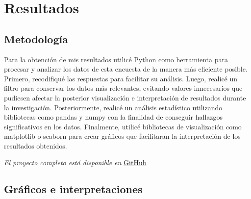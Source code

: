 \documentclass{article}
\begin{document}
	\section*{Resultados}
	
	\subsection*{Metodología}
	
	 Para la obtención de mis resultados utilicé Python como herramienta para procesar y analizar los datos de esta encuesta de la manera más eficiente posible. Primero, recodifiqué las respuestas para facilitar su análisis. Luego, realicé un filtro para conservar los datos más relevantes, evitando valores innecesarios que pudiesen afectar la posterior visualización e interpretación de resultados durante la investigación. Posteriormente, realicé un análisis estadístico utilizando bibliotecas como pandas y numpy con la finalidad de conseguir hallazgos significativos en los datos. Finalmente, utilicé bibliotecas de visualización como matplotlib o seaborn para crear gráficos que facilitaran la interpretación de los resultados obtenidos.
	 
	\begin{center}
		{\footnotesize \textit{El proyecto completo está disponible en} \href{https://github.com/ElK1000o/Taller-Ciencia-de-Datos-I/tree/main/Proyecto}{GitHub}}
	\end{center}
	
	\subsection*{Gráficos e interpretaciones}
	
\end{document}
